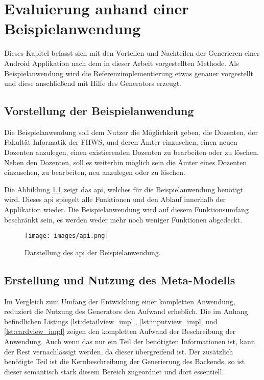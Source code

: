 \chapter{Evaluierung anhand einer Beispielanwendung}
Dieses Kapitel befasst sich mit den Vorteilen und Nachteilen der Generieren einer Android Applikation nach dem in dieser Arbeit vorgestellten Methode. Als Beispielanwendung wird die Referenzimplementierung etwas genauer vorgestellt und diese anschließend mit Hilfe des Generators erzeugt.

\section{Vorstellung der Beispielanwendung}

Die Beispielanwendung soll dem Nutzer die Möglichkeit geben, die Dozenten, der Fakultät Informatik der FHWS, und deren Ämter einzusehen, einen neuen Dozenten anzulegen, einen existierenden Dozenten zu bearbeiten oder zu löschen. Neben den Dozenten, soll es weiterhin möglich sein die Ämter eines Dozenten einzusehen, zu bearbeiten, neu anzulegen oder zu löschen.

Die Abbildung \ref{fig:api} zeigt das \acf{api}, welches für die Beispielanwendung benötigt wird. Dieses \ac{api} spiegelt alle Funktionen und den Ablauf innerhalb der Applikation wieder. Die Beispielanwendung wird auf diesem Funktionsumfang beschränkt sein, es werden weder mehr noch weniger Funktionen abgedeckt.

\begin{figure}[H]
	\begin{center}
		\texttt{[image: images/api.png]}
		\caption{Darstellung des \ac{api} der Beispielanwendung.}
		\label{fig:api}
	\end{center}
\end{figure}

\section{Erstellung und Nutzung des Meta-Modells}

Im Vergleich zum Umfang der Entwicklung einer kompletten Anwendung, reduziert die Nutzung des Generators den Aufwand erheblich. Die im Anhang befindlichen Listings \ref{lst:detailview_impl}, \ref{lst:inputview_impl} und \ref{lst:cardview_impl} zeigen den kompletten Aufwand der Beschreibung der Anwendung. Auch wenn das nur ein Teil der benötigten Informationen ist, kann der Rest vernachlässigt werden, da dieser übergreifend ist. Der zusätzlich benötigte Teil ist die Kernbeschreibung der Generierung des Backends, so ist dieser semantisch stark diesem Bereich zugeordnet und dort essentiell.

